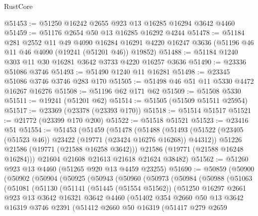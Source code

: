 \begin{lexlean}{RustCore}
\begin{coremodule}
@51453 := @51250 @16242 @2655 @923 @13 @16285 @16294 @3642 @4460
@51459 := @51176 @2654 @50 @13 @16285 @16292 @4244
@51478 := @51184
    @281
    @2552
    @11
    @49
    @4090
    @16284
    @16291
    @4220
    @16247
    @3636
    (@51196 @46 @11 @46 @4090 (@19241 (@51201 @46)) @19852)
@51488 := @51184 @1240 @303 @11 @30 @16281 @3642 @3733 @4220 @16257 @3636
@51490 := @23336 @51086 @3746
@51493 := @51490 @1240 @11 @16281
@51498 := @23345 @51086 @3746 @3746 @283 @170
@51505 := @51498 @46 @51 @11 @5330 @4472 @16267 @16276
@51508 := @51196 @62 @171 @62
@51509 := @51508 @5330
@51511 := @19241 (@51201 @62)
@51514 := @51505 (@51509 @51511 @25954)
@51517 := @23369 (@23378 (@23393 @170))
@51518 := @51514 @51517
@51521 := @21772 (@23399 @170 @200)
@51522 := @51518 @51521
@51523 := @23416 @51
@51554 := @51453
    (@51459
      (@51478
        (@51488
          (@51493 (@51522 (@23405 (@51523 @46)) @23422 (@19771 (@23424 @16276 @16268)) @44312))
          @51226
          @21586
          (@19771 (@21588 @16258 @3642)))
        @21586
        (@19771 (@21588 @16248 @16284)))
      @21604
      @21608
      @21613
      @21618
      @21624
      @38482)
@51562 := @51260 @923 @13 @4460 (@51265 @920 @13 @4459 @23255)
@51690 := @50859
    (@50900
      (@50902
        (@50904
          (@50925
            (@50943
              (@50960
                (@50973
                  (@50984
                    (@50988
                      (@51063
                        (@51081
                          (@51130
                            (@51141
                              (@51445 (@51554 @51562))
                              (@51250
                                @16297
                                @2661
                                @923
                                @13
                                @3642
                                @16321
                                @3642
                                @4460
                                (@51402
                                  @354
                                  @2660
                                  @50
                                  @13
                                  @3642
                                  @16319
                                  @3746
                                  @2391
                                  (@51412
                                    @2660
                                    @50
                                    @16319
                                    (@51417
                                      @279
                                      @2659

\end{coremodule}
\end{lexlean}
